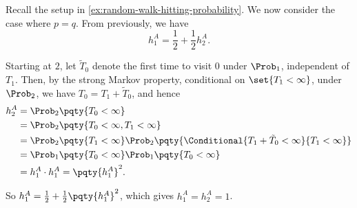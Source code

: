 \begin{example}
    Recall the setup in \autoref{ex:random-walk-hitting-probability}. We now consider the case where \(p = q\). From previously, we have
    \[
        h_1^A = \frac{1}{2} + \frac{1}{2} h_2^A.
    \]

    Starting at \(2\), let \(\tilde{T}_0\) denote the first time to visit \(0\) under \(\Prob_1\), independent of \(T_1\). Then, by the strong Markov property, conditional on \(\set{T_1 < \infty}\), under \(\Prob_2\), we have \(T_0 = T_1 + \tilde{T}_0\), and hence
    \begin{align*}
        h_2^A &= \Prob_2 \pqty{T_0 < \infty} \\
        &= \Prob_2 \pqty{T_0 < \infty, T_1 < \infty} \\
        &= \Prob_2 \pqty{T_1 < \infty} \Prob_2 \pqty{\Conditional{T_1 + \tilde{T}_0 < \infty}{T_1 < \infty}} \\
        &= \Prob_1 \pqty{T_0 < \infty} \Prob_1 \pqty{T_0 < \infty} \\
        &= h_1^A \cdot h_1^A = \pqty{h_1^A}^2.
    \end{align*}

    So \(h_1^A = \frac{1}{2} + \frac{1}{2} \pqty{h_1^A}^2\), which gives \(h_1^A = h_2^A = 1\).
\end{example}